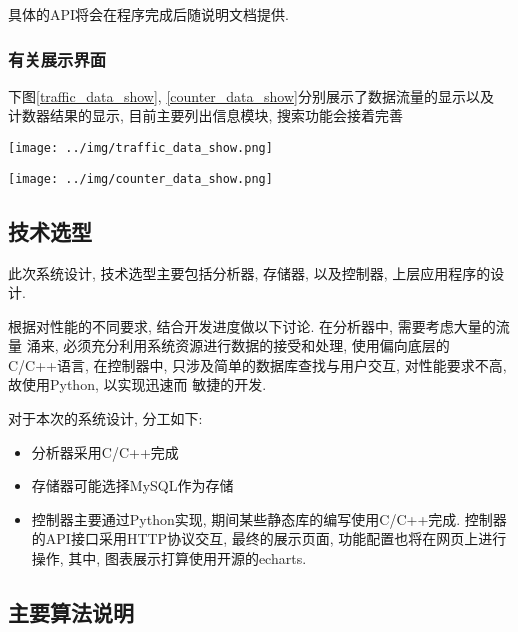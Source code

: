 {\begin{mdframed}[everyline=true]
具体的API将会在程序完成后随说明文档提供.


\subsubsection{有关展示界面}

下图\ref{traffic_data_show}, \ref{counter_data_show}分别展示了数据流量的显示以及
计数器结果的显示, 目前主要列出信息模块, 搜索功能会接着完善

\begin{center}
    \texttt{[image: ../img/traffic\_data\_show.png]}
    \label{traffic_data_show}
\end{center}

\begin{center}
    \texttt{[image: ../img/counter\_data\_show.png]}
    \label{counter_data_show}
\end{center}


\subsection{技术选型}

此次系统设计, 技术选型主要包括分析器, 存储器, 以及控制器, 上层应用程序的设计.

根据对性能的不同要求, 结合开发进度做以下讨论. 在分析器中, 需要考虑大量的流量
涌来, 必须充分利用系统资源进行数据的接受和处理, 使用偏向底层的C/C++语言, 在控制器中,
只涉及简单的数据库查找与用户交互, 对性能要求不高, 故使用Python, 以实现迅速而
敏捷的开发.

对于本次的系统设计, 分工如下:
\begin{itemize}
    \setlength\itemsep{0.1em}
    \item 分析器采用C/C++完成
    \item 存储器可能选择MySQL作为存储
    \item 控制器主要通过Python实现, 期间某些静态库的编写使用C/C++完成.
            控制器的API接口采用HTTP协议交互, 最终的展示页面,
            功能配置也将在网页上进行操作, 其中, 图表展示打算使用开源的echarts.
\end{itemize}


\subsection{主要算法说明}\label{主要算法说明}


\end{mdframed}}
